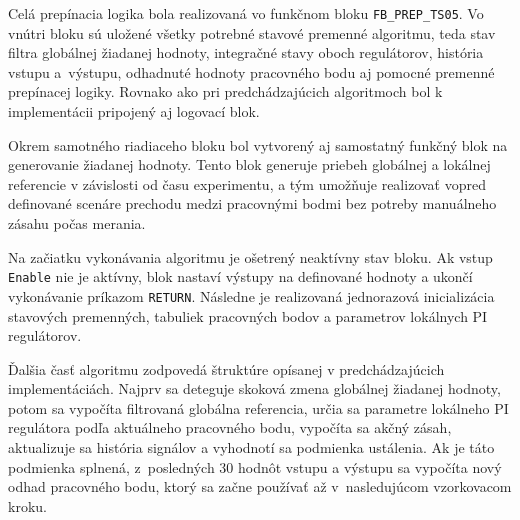 \medskip

Celá prepínacia logika bola realizovaná vo funkčnom bloku
\texttt{FB\_PREP\_TS05}. Vo vnútri bloku sú uložené všetky potrebné stavové
premenné algoritmu, teda stav filtra globálnej žiadanej hodnoty, integračné
stavy oboch regulátorov, história vstupu a~výstupu, odhadnuté hodnoty
pracovného bodu aj pomocné premenné prepínacej logiky. Rovnako ako pri
predchádzajúcich algoritmoch bol k implementácii pripojený aj logovací blok.

\medskip

Okrem samotného riadiaceho bloku bol vytvorený aj samostatný funkčný blok
na generovanie žiadanej hodnoty. Tento blok generuje priebeh globálnej a
lokálnej referencie v závislosti od času experimentu, a tým umožňuje
realizovať vopred definované scenáre prechodu medzi pracovnými bodmi
bez potreby manuálneho zásahu počas merania.

\medskip

Na začiatku vykonávania algoritmu je ošetrený neaktívny stav bloku.
Ak vstup \texttt{Enable} nie je aktívny, blok nastaví výstupy na definované
hodnoty a ukončí vykonávanie príkazom \texttt{RETURN}. Následne je
realizovaná jednorazová inicializácia stavových premenných, tabuliek
pracovných bodov a parametrov lokálnych PI regulátorov.

\medskip

Ďalšia časť algoritmu zodpovedá štruktúre opísanej v predchádzajúcich
implementáciách. Najprv sa deteguje skoková zmena globálnej žiadanej
hodnoty, potom sa vypočíta filtrovaná globálna referencia, určia sa
parametre lokálneho PI regulátora podľa aktuálneho pracovného bodu,
vypočíta sa akčný zásah, aktualizuje sa história signálov a vyhodnotí sa
podmienka ustálenia. Ak je táto podmienka splnená, z~posledných 30 hodnôt
vstupu a výstupu sa vypočíta nový odhad pracovného bodu, ktorý sa začne
používať až v~nasledujúcom vzorkovacom kroku.


